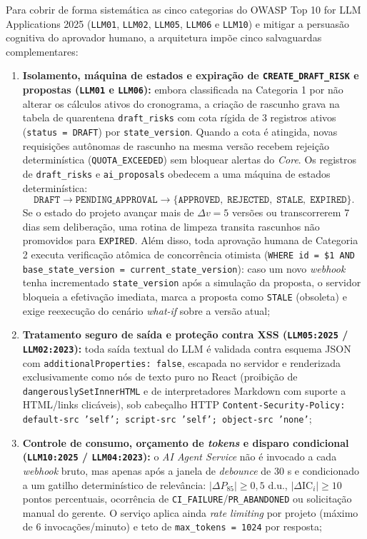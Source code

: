 \documentclass[12pt,openany,oneside,a4paper,english,brazilian,sumario=tradicional]{abntex2}
\newcommand{\IC}{\mathrm{IC}}
\begin{document}
Para cobrir de forma sistemática as cinco categorias do OWASP Top 10 for LLM Applications 2025 (\texttt{LLM01}, \texttt{LLM02}, \texttt{LLM05}, \texttt{LLM06} e \texttt{LLM10}) e mitigar a persuasão cognitiva do aprovador humano, a arquitetura impõe cinco salvaguardas complementares:

\begin{enumerate}
  \item \textbf{Isolamento, máquina de estados e expiração de \texttt{CREATE\_DRAFT\_RISK} e propostas (\texttt{LLM01} e \texttt{LLM06}):} embora classificada na Categoria 1 por não alterar os cálculos ativos do cronograma, a criação de rascunho grava na tabela de quarentena \texttt{draft\_risks} com cota rígida de 3 registros ativos (\texttt{status = DRAFT}) por \texttt{state\_version}. Quando a cota é atingida, novas requisições autônomas de rascunho na mesma versão recebem rejeição determinística (\texttt{QUOTA\_EXCEEDED}) sem bloquear alertas do \textit{Core}. Os registros de \texttt{draft\_risks} e \texttt{ai\_proposals} obedecem a uma máquina de estados determinística:
  {\small
  \begin{equation}
  \texttt{DRAFT} \to \texttt{PENDING\_APPROVAL} \to \big\{\texttt{APPROVED},\;\texttt{REJECTED},\;\texttt{STALE},\;\texttt{EXPIRED}\big\}.
  \end{equation}}
  Se o estado do projeto avançar mais de $\Delta v = 5$ versões ou transcorrerem 7 dias sem deliberação, uma rotina de limpeza transita rascunhos não promovidos para \texttt{EXPIRED}. Além disso, toda aprovação humana de Categoria 2 executa verificação atômica de concorrência otimista (\texttt{WHERE id = \$1 AND base\_state\_version = current\_state\_version}): caso um novo \textit{webhook} tenha incrementado \texttt{state\_version} após a simulação da proposta, o servidor bloqueia a efetivação imediata, marca a proposta como \texttt{STALE} (obsoleta) e exige reexecução do cenário \textit{what-if} sobre a versão atual;
  \item \textbf{Tratamento seguro de saída e proteção contra XSS (\texttt{LLM05:2025} / \texttt{LLM02:2023}):} toda saída textual do LLM é validada contra esquema JSON com \texttt{additionalProperties: false}, escapada no servidor e renderizada exclusivamente como nós de texto puro no React (proibição de \texttt{dangerouslySetInnerHTML} e de interpretadores Markdown com suporte a HTML/links clicáveis), sob cabeçalho HTTP \texttt{Content-Security-Policy: default-src 'self'; script-src 'self'; object-src 'none'};
  \item \textbf{Controle de consumo, orçamento de \textit{tokens} e disparo condicional (\texttt{LLM10:2025} / \texttt{LLM04:2023}):} o \textit{AI Agent Service} não é invocado a cada \textit{webhook} bruto, mas apenas após a janela de \textit{debounce} de 30 s e condicionado a um gatilho determinístico de relevância: $|\Delta P_{85}| \ge 0{,}5$ d.u., $|\Delta\IC_i| \ge 10$ pontos percentuais, ocorrência de \texttt{CI\_FAILURE}/\texttt{PR\_ABANDONED} ou solicitação manual do gerente. O serviço aplica ainda \textit{rate limiting} por projeto (máximo de 6 invocações/minuto) e teto de \texttt{max\_tokens = 1024} por resposta;

\end{enumerate}
\end{document}
